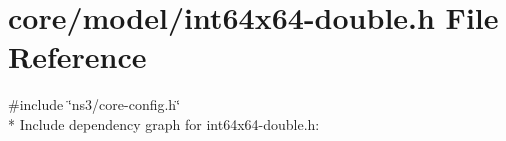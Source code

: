 \hypertarget{int64x64-double_8h}{}\section{core/model/int64x64-\/double.h File Reference}
\label{int64x64-double_8h}
{\ttfamily \#include \char`\"{}ns3/core-\/config.\+h\char`\"{}}\\*
Include dependency graph for int64x64-\/double.h\+:
